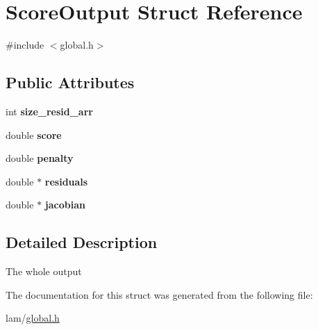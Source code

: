 \hypertarget{structScoreOutput}{
\section{ScoreOutput Struct Reference}
\label{structScoreOutput}
}


{\ttfamily \#include $<$global.h$>$}\subsection*{Public Attributes}
\begin{DoxyCompactItemize}
\item 
\hypertarget{structScoreOutput_aebd121d683fa95a2a27737d45f205dfd}{
int {\bfseries size\_\-resid\_\-arr}}
\label{structScoreOutput_aebd121d683fa95a2a27737d45f205dfd}

\item 
\hypertarget{structScoreOutput_a66612ab1ed0f7add44f1c6f7ccac36f8}{
double {\bfseries score}}
\label{structScoreOutput_a66612ab1ed0f7add44f1c6f7ccac36f8}

\item 
\hypertarget{structScoreOutput_a0659beec3f5fd8fce1e416f2ff12fe2c}{
double {\bfseries penalty}}
\label{structScoreOutput_a0659beec3f5fd8fce1e416f2ff12fe2c}

\item 
\hypertarget{structScoreOutput_a4d85b938f7d2f425f55b5374171481a6}{
double $\ast$ {\bfseries residuals}}
\label{structScoreOutput_a4d85b938f7d2f425f55b5374171481a6}

\item 
\hypertarget{structScoreOutput_ae0924520cc6836da3e04ac4cd1691d42}{
double $\ast$ {\bfseries jacobian}}
\label{structScoreOutput_ae0924520cc6836da3e04ac4cd1691d42}

\end{DoxyCompactItemize}


\subsection{Detailed Description}
The whole output 

The documentation for this struct was generated from the following file:\begin{DoxyCompactItemize}
\item 
lam/\hyperlink{global_8h}{global.h}\end{DoxyCompactItemize}
